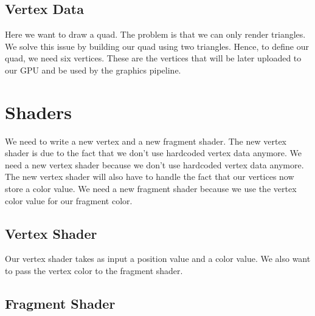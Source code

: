 \subsection{Vertex Data}

Here we want to draw a quad.
The problem is that we can only render triangles.
We solve this issue by building our quad using two triangles.
Hence, to define our quad, we need six vertices.
These are the vertices that will be later uploaded to our GPU and be used
by the graphics pipeline.

\begin{minipage}{\linewidth}{\noindent}
    
\end{minipage}

\section{Shaders}

We need to write a new vertex and a new fragment shader.
The new vertex shader is due to the fact that we don't use
hardcoded vertex data anymore.
We need a new vertex shader because we don't use hardcoded vertex data anymore.
The new vertex shader will also have to handle the fact that
our vertices now store a color value.
We need a new fragment shader because we use the vertex color value for
our fragment color.

\subsection{Vertex Shader}

Our vertex shader takes as input a position value and a color value.
We also want to pass the vertex color to the fragment shader.

\begin{minipage}{\linewidth}{\noindent}
    
\end{minipage}

\subsection{Fragment Shader}

